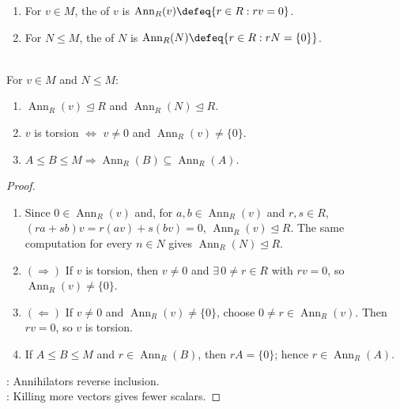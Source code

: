 \begin{definition} \label{def:module-annihilator} 
\begin{enumerate}[label=(\roman*)]
\setlength{\itemsep}{0pt}
\item For $v\in M$, the  of $v$ is $\operatorname{Ann}_R(v)\defeq\{r\in R:rv=0\}$.
\item For $N\leq M$, the  of $N$ is $\operatorname{Ann}_R(N)\defeq\{r\in R:rN=\{0\}\}$.
\end{enumerate}
\end{definition}

\begin{proposition} \label{prop:annihilator-basic-properties} \\
For $v\in M$ and $N\leq M$:
\begin{enumerate}[label=(\roman*)]
\setlength{\itemsep}{0pt}
\item $\operatorname{Ann}_R(v)\trianglelefteq R$ and $\operatorname{Ann}_R(N)\trianglelefteq R$.
\item $v$ is torsion $\Longleftrightarrow$ $v\neq0$ and $\operatorname{Ann}_R(v)\neq\{0\}$.
\item $A\leq B\leq M \Longrightarrow \operatorname{Ann}_R(B)\subseteq\operatorname{Ann}_R(A)$.
\end{enumerate}
\begin{proof}
\begin{enumerate}[label=\roman*.]
\setlength{\itemsep}{0pt}
\item[$(i)$] Since $0\in\operatorname{Ann}_R(v)$ and, for $a,b\in\operatorname{Ann}_R(v)$ and $r,s\in R$, $(ra+sb)v=r(av)+s(bv)=0$, $\operatorname{Ann}_R(v)\trianglelefteq R$. The same computation for every $n\in N$ gives $\operatorname{Ann}_R(N)\trianglelefteq R$.
\item[$(ii)$]$(\Rightarrow)$ If $v$ is torsion, then $v\neq0$ and $\exists\,0\neq r\in R$ with $rv=0$, so $\operatorname{Ann}_R(v)\neq\{0\}$.
\item[$(ii)$]$(\Leftarrow)$ If $v\neq0$ and $\operatorname{Ann}_R(v)\neq\{0\}$, choose $0\neq r\in\operatorname{Ann}_R(v)$. Then $rv=0$, so $v$ is torsion.
\item[$(iii)$] If $A\leq B\leq M$ and $r\in\operatorname{Ann}_R(B)$, then $rA=\{0\}$; hence $r\in\operatorname{Ann}_R(A)$.
\end{enumerate}
: Annihilators reverse inclusion.\\
: Killing more vectors gives fewer scalars.
\end{proof}
\end{proposition}

